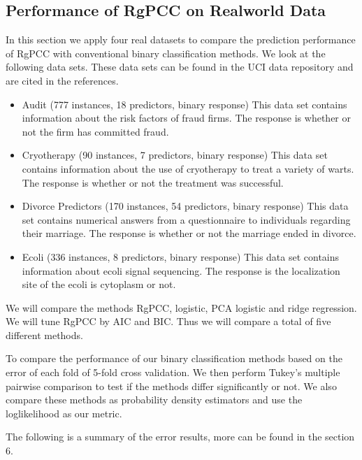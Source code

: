 \documentclass[main.tex]{subfiles}
\begin{document}
%
%
%
%
%
%
%
%
%
%
%
%
%
%
%

\subsection{Performance of RgPCC on Realworld Data}

In this section we apply four real datasets to compare the prediction performance of RgPCC with conventional binary classification methods. We look at the following data sets. These data sets can be found in the UCI data repository and are cited in the references.
\begin{itemize}
	\item Audit (777 instances, 18 predictors, binary response) This data set contains information about the risk factors of fraud firms. The response is whether or not the firm has committed fraud. \cite{audit}
    \item Cryotherapy (90 instances, 7 predictors, binary response) This data set contains information about the use of cryotherapy to treat a variety of warts. The response is whether or not the treatment was successful. \cite{cryo}
    \item Divorce Predictors (170 instances, 54 predictors, binary response) This data set contains numerical answers from a questionnaire to individuals regarding their marriage. The response is whether or not the marriage ended in divorce. \cite{divorce}
    \item Ecoli (336 instances, 8 predictors, binary response) This data set contains information about ecoli signal sequencing. The response is the localization site of the ecoli is cytoplasm or not. \cite{ecoli}
\end{itemize}

We will compare the methods RgPCC, logistic, PCA logistic and ridge regression. We will tune RgPCC by AIC and BIC. Thus we will compare a total of five different methods. 

To compare the performance of our binary classification methods based on the error of each fold of 5-fold cross validation. We then perform Tukey's multiple pairwise comparison to test if the methods differ significantly or not. We also compare these methods as probability density estimators and use the loglikelihood as our metric.

The following is a summary of the error results, more can be found in the section 6.
\end{document}
